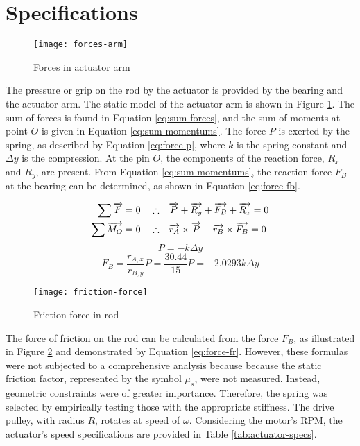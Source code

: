 \section{Specifications}

\begin{figure}[H]
    \centering
    \texttt{[image: forces-arm]}
    \caption{Forces in actuator arm}
    \label{fig:forces-arm}
\end{figure}

The pressure or grip on the rod by the actuator is provided by the bearing and the actuator arm. The static model of the actuator arm is shown in Figure \ref{fig:forces-arm}. The sum of forces is found in Equation \ref{eq:sum-forces}, and the sum of moments at point $O$ is given in Equation \ref{eq:sum-momentums}. The force $P$ is exerted by the spring, as described by Equation \ref{eq:force-p}, where $k$ is the spring constant and $\Delta y$ is the compression. At the pin $O$, the components of the reaction force, $R_x$ and $R_y$, are present. From Equation \ref{eq:sum-momentums}, the reaction force $F_B$ at the bearing can be determined, as shown in Equation \ref{eq:force-fb}.

\begin{align}
    \label{eq:sum-forces}
    \sum \overrightarrow{F}=0 \quad\therefore& \quad \overrightarrow{P} + \overrightarrow{R_y} + \overrightarrow{F_B}+\overrightarrow{R_x} = 0 \\
    \label{eq:sum-momentums}
    \sum \overrightarrow{M_O}=0 \quad\therefore& \quad \overrightarrow{r_A}\times\overrightarrow{P} + \overrightarrow{r_B}\times\overrightarrow{F_B} = 0
\end{align}
\begin{equation}
    \label{eq:force-p}
    P=-k\Delta y
\end{equation}
\begin{equation}
    \label{eq:force-fb}
    F_B = \frac{r_{A,x}}{r_{B,y}}P = \frac{30.44}{15}P=-2.0293k\Delta y
\end{equation}

\begin{figure}[H]
    \centering
    \texttt{[image: friction-force]}
    \caption{Friction force in rod}
    \label{fig:friction-force}
\end{figure}

The force of friction on the rod can be calculated from the force $F_B$, as illustrated in Figure \ref{fig:friction-force} and demonstrated by Equation \ref{eq:force-fr}. However, these formulas were not subjected to a comprehensive analysis because because the static friction factor, represented by the symbol $\mu_s$, were not measured. Instead, geometric constraints were of greater importance. Therefore, the spring was selected by empirically testing those with the appropriate stiffness. The drive pulley, with radius $R$, rotates at speed of $\omega$. Considering the motor's RPM, the actuator's speed specifications are provided in Table \ref{tab:actuator-specs}.

